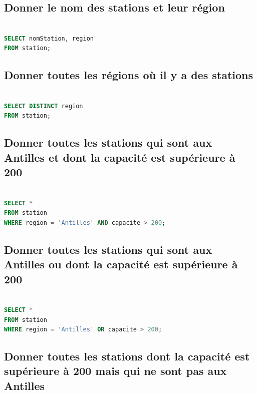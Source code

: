 \documentclass{article}
\begin{document}
\subsection{Donner le nom des stations et leur région}

\begin{lstlisting}[language=SQL]

SELECT nomStation, region 
FROM station;

\end{lstlisting}

\subsection{Donner toutes les régions où il y a des stations}

\begin{lstlisting}[language=SQL]

SELECT DISTINCT region 
FROM station;

\end{lstlisting}

\subsection{Donner toutes les stations qui sont aux Antilles et dont la capacité est supérieure à 200}

\begin{lstlisting}[language=SQL]

SELECT * 
FROM station 
WHERE region = 'Antilles' AND capacite > 200;

\end{lstlisting}

\subsection{Donner toutes les stations qui sont aux Antilles ou dont la capacité est supérieure à 200}

\begin{lstlisting}[language=SQL]

SELECT * 
FROM station 
WHERE region = 'Antilles' OR capacite > 200;

\end{lstlisting}

\subsection{Donner toutes les stations dont la capacité est supérieure à 200 mais qui ne sont pas aux Antilles}
\end{document}
